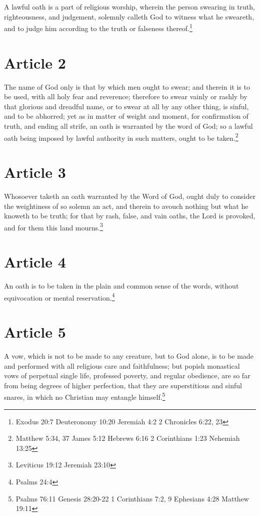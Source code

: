 \documentclass[12pt,letterpaper]{book}
\begin{document}
A lawful oath is a part of religious worship, wherein the person swearing in truth, righteousness, and judgement, solemnly calleth God to witness what he sweareth, and to judge him according to the truth or falseness thereof.\footnote{Exodus 20:7 Deuteronomy 10:20 Jeremiah 4:2 2 Chronicles 6:22, 23}

\section{Article 2}

The name of God only is that by which men ought to swear; and therein it is to be used, with all holy fear and reverence; therefore to swear vainly or rashly by that glorious and dreadful name, or to swear at all by any other thing, is sinful, and to be abhorred; yet as in matter of weight and moment, for confirmation of truth, and ending all strife, an oath is warranted by the word of God; so a lawful oath being imposed by lawful authority in such matters, ought to be taken.\footnote{Matthew 5:34, 37 James 5:12 Hebrews 6:16 2 Corinthians 1:23 Nehemiah 13:25}

\section{Article 3}

Whosoever taketh an oath warranted by the Word of God, ought duly to consider the weightiness of so solemn an act, and therein to avouch nothing but what he knoweth to be truth; for that by rash, false, and vain oaths, the Lord is provoked, and for them this land mourns.\footnote{Leviticus 19:12 Jeremiah 23:10}

\section{Article 4}

An oath is to be taken in the plain and common sense of the words, without equivocation or mental reservation.\footnote{Psalms 24:4}

\section{Article 5}

A vow, which is not to be made to any creature, but to God alone, is to be made and performed with all religious care and faithfulness; but popish monastical vows of perpetual single life, professed poverty, and regular obedience, are so far from being degrees of higher perfection, that they are superstitious and sinful snares, in which no Christian may entangle himself.\footnote{Psalms 76:11 Genesis 28:20-22 1 Corinthians 7:2, 9 Ephesians 4:28 Matthew 19:11}
\end{document}
